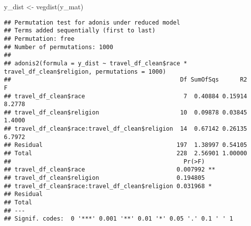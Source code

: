 \documentclass[
]{article}
\newenvironment{Shaded}{\begin{snugshade}}{\end{snugshade}}
\newcommand{\AttributeTok}[1]{\textcolor[rgb]{0.77,0.63,0.00}{#1}}
\newcommand{\DecValTok}[1]{\textcolor[rgb]{0.00,0.00,0.81}{#1}}
\newcommand{\FunctionTok}[1]{\textcolor[rgb]{0.00,0.00,0.00}{#1}}
\newcommand{\NormalTok}[1]{#1}
\newcommand{\OtherTok}[1]{\textcolor[rgb]{0.56,0.35,0.01}{#1}}
\newcommand{\SpecialCharTok}[1]{\textcolor[rgb]{0.00,0.00,0.00}{#1}}
\begin{document}
\hfill\break

\begin{Shaded}
\begin{Highlighting}[]
\NormalTok{y\_dist }\OtherTok{\textless{}{-}} \FunctionTok{vegdist}\NormalTok{(y\_mat)}
\end{Highlighting}
\end{Shaded}

\begin{Shaded}
\end{Shaded}

\begin{verbatim}
## Permutation test for adonis under reduced model
## Terms added sequentially (first to last)
## Permutation: free
## Number of permutations: 1000
## 
## adonis2(formula = y_dist ~ travel_df_clean$race * travel_df_clean$religion, permutations = 1000)
##                                                Df SumOfSqs      R2      F
## travel_df_clean$race                            7  0.40884 0.15914 8.2778
## travel_df_clean$religion                       10  0.09878 0.03845 1.4000
## travel_df_clean$race:travel_df_clean$religion  14  0.67142 0.26135 6.7972
## Residual                                      197  1.38997 0.54105       
## Total                                         228  2.56901 1.00000       
##                                                 Pr(>F)   
## travel_df_clean$race                          0.007992 **
## travel_df_clean$religion                      0.194805   
## travel_df_clean$race:travel_df_clean$religion 0.031968 * 
## Residual                                                 
## Total                                                    
## ---
## Signif. codes:  0 '***' 0.001 '**' 0.01 '*' 0.05 '.' 0.1 ' ' 1
\end{verbatim}

\hfill\break
\end{document}
